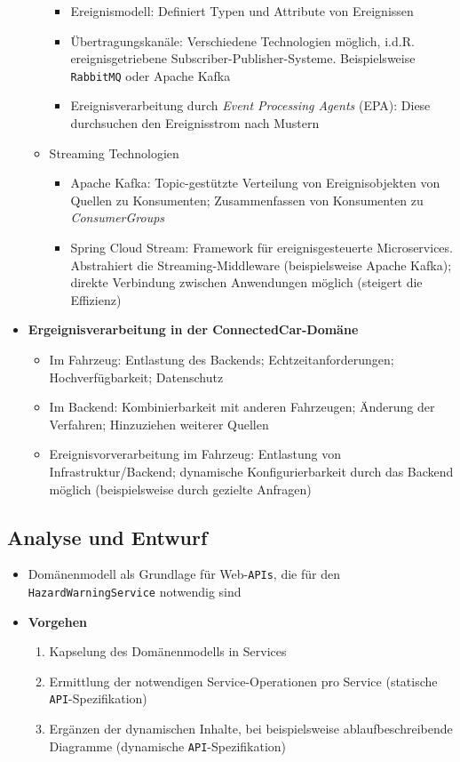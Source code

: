 \begin{itemize}
\begin{itemize}
		\begin{itemize}
			\item Ereignismodell: Definiert Typen und Attribute von Ereignissen
			\item Übertragungskanäle: Verschiedene Technologien möglich, i.d.R. ereignisgetriebene Subscriber-Publisher-Systeme. Beispielsweise \texttt{RabbitMQ} oder Apache Kafka
			\item Ereignisverarbeitung durch \textit{Event Processing Agents} (EPA): Diese durchsuchen den Ereignisstrom nach Mustern
		\end{itemize}
		\item Streaming Technologien
		\begin{itemize}
			\item Apache Kafka: Topic-gestützte Verteilung von Ereignisobjekten von Quellen zu Konsumenten; Zusammenfassen von Konsumenten zu \textit{ConsumerGroups}
			\item Spring Cloud Stream: Framework für ereignisgesteuerte Microservices. Abstrahiert die Streaming-Middleware (beispielsweise Apache Kafka); direkte Verbindung zwischen Anwendungen möglich (steigert die Effizienz)
		\end{itemize}
	\end{itemize}
	\item \textbf{Ergeignisverarbeitung in der ConnectedCar-Domäne}
	\begin{itemize}
		\item Im Fahrzeug: Entlastung des Backends; Echtzeitanforderungen; Hochverfügbarkeit; Datenschutz
		\item Im Backend: Kombinierbarkeit mit anderen Fahrzeugen; Änderung der Verfahren; Hinzuziehen weiterer Quellen
		\item Ereignisvorverarbeitung im Fahrzeug: Entlastung von Infrastruktur/Backend; dynamische Konfigurierbarkeit durch das Backend möglich (beispielsweise durch gezielte Anfragen)
	\end{itemize}
\end{itemize}


\subsection{Analyse und Entwurf}
\begin{itemize}
	\item Domänenmodell als Grundlage für Web-\texttt{APIs}, die für den \texttt{HazardWarningService} notwendig sind
	\item \textbf{Vorgehen}
	\begin{enumerate}
		\item Kapselung des Domänenmodells in Services
		\item Ermittlung der notwendigen Service-Operationen pro Service (statische \texttt{API}-Spezifikation)
		\item Ergänzen der dynamischen Inhalte, bei beispielsweise ablaufbeschreibende Diagramme (dynamische \texttt{API}-Spezifikation)
	\end{enumerate}
\end{itemize}



